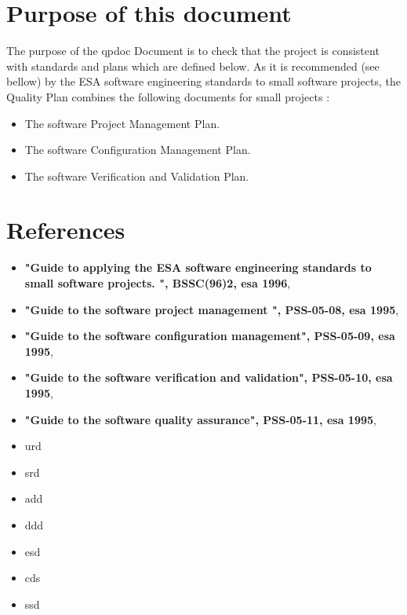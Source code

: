 \section{Purpose of this document}
\label{Sec:QP-Purpose-Scope}
The purpose of the \ac{qpdoc} Document is to check that the project is consistent with standards and plans which are defined below. As it is recommended (see bellow) by the ESA software engineering standards to small software projects, the Quality Plan combines the following documents for small projects :
\begin{itemize}
\item The software Project Management Plan.
\item The software Configuration Management Plan.
\item The software Verification and Validation Plan.
\end{itemize}










\section{References}
\label{Sec:ADD-References}
\begin{itemize}
\item \textbf{"Guide to applying the ESA software engineering standards to small software projects. ", BSSC(96)2, \ac{esa} 1996},
\item \textbf{"Guide to the  software project management ", PSS-05-08, \ac{esa} 1995},
\item \textbf{"Guide to the  software configuration management", PSS-05-09, \ac{esa} 1995},
\item \textbf{"Guide to the  software verification and validation", PSS-05-10, \ac{esa} 1995},
\item \textbf{"Guide to the  software quality assurance", PSS-05-11, \ac{esa} 1995},
\item \ac{urd}
\item \ac{srd}
\item \ac{add}
\item \ac{ddd}
\item \ac{esd}
\item \ac{cds}
\item \ac{ssd}
\end{itemize}

